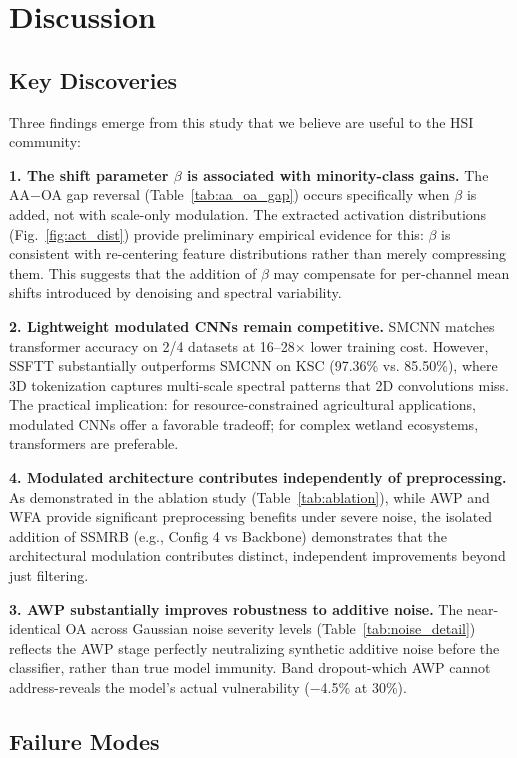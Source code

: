\documentclass[conference]{IEEEtran}
\begin{document}
{{\section{Discussion}

\subsection{Key Discoveries}

Three findings emerge from this study that we believe are useful to the HSI community:

\textbf{1. The shift parameter $\beta$ is associated with minority-class gains.} The AA$-$OA gap reversal (Table~\ref{tab:aa_oa_gap}) occurs specifically when $\beta$ is added, not with scale-only modulation. The extracted activation distributions (Fig.~\ref{fig:act_dist}) provide preliminary empirical evidence for this: $\beta$ is consistent with re-centering feature distributions rather than merely compressing them. This suggests that the addition of $\beta$ may compensate for per-channel mean shifts introduced by denoising and spectral variability.

\textbf{2. Lightweight modulated CNNs remain competitive.} SMCNN matches transformer accuracy on 2/4 datasets at 16--28$\times$ lower training cost. However, SSFTT substantially outperforms SMCNN on KSC (97.36\% vs. 85.50\%), where 3D tokenization captures multi-scale spectral patterns that 2D convolutions miss. The practical implication: for resource-constrained agricultural applications, modulated CNNs offer a favorable tradeoff; for complex wetland ecosystems, transformers are preferable.

\textbf{4. Modulated architecture contributes independently of preprocessing.} As demonstrated in the ablation study (Table~\ref{tab:ablation}), while AWP and WFA provide significant preprocessing benefits under severe noise, the isolated addition of SSMRB (e.g., Config 4 vs Backbone) demonstrates that the architectural modulation contributes distinct, independent improvements beyond just filtering.

\textbf{3. AWP substantially improves robustness to additive noise.} The near-identical OA across Gaussian noise severity levels (Table~\ref{tab:noise_detail}) reflects the AWP stage perfectly neutralizing synthetic additive noise before the classifier, rather than true model immunity. Band dropout-which AWP cannot address-reveals the model's actual vulnerability ($-$4.5\% at 30\%).

\subsection{Failure Modes}
\label{sec:failure}

}}
\end{document}
